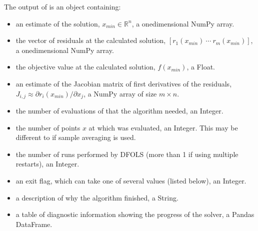 \documentclass[letterpaper,10pt,english]{sphinxmanual}
\begin{document}
\sphinxAtStartPar
The output of  is an object containing:
\begin{itemize}
\item {} 
\sphinxAtStartPar
{} \sphinxhyphen{} an estimate of the solution, \(x_{min}\in\mathbb{R}^n\), a one\sphinxhyphen{}dimensional NumPy array.

\item {} 
\sphinxAtStartPar
{} \sphinxhyphen{} the vector of residuals at the calculated solution, \([r_1(x_{min})\:\cdots\: r_m(x_{min})]\), a one\sphinxhyphen{}dimensional NumPy array.

\item {} 
\sphinxAtStartPar
{} \sphinxhyphen{} the objective value at the calculated solution, \(f(x_{min})\), a Float.

\item {} 
\sphinxAtStartPar
{} \sphinxhyphen{} an estimate of the Jacobian matrix of first derivatives of the residuals, \(J_{i,j} \approx \partial r_i(x_{min})/\partial x_j\), a NumPy array of size \(m\times n\).

\item {} 
\sphinxAtStartPar
{} \sphinxhyphen{} the number of evaluations of  that the algorithm needed, an Integer.

\item {} 
\sphinxAtStartPar
{} \sphinxhyphen{} the number of points \(x\) at which  was evaluated, an Integer. This may be different to  if sample averaging is used.

\item {} 
\sphinxAtStartPar
{} \sphinxhyphen{} the number of runs performed by DFO\sphinxhyphen{}LS (more than 1 if using multiple restarts), an Integer.

\item {} 
\sphinxAtStartPar
{} \sphinxhyphen{} an exit flag, which can take one of several values (listed below), an Integer.

\item {} 
\sphinxAtStartPar
{} \sphinxhyphen{} a description of why the algorithm finished, a String.

\item {} 
\sphinxAtStartPar
{} \sphinxhyphen{} a table of diagnostic information showing the progress of the solver, a Pandas DataFrame.

\end{itemize}
\end{document}
